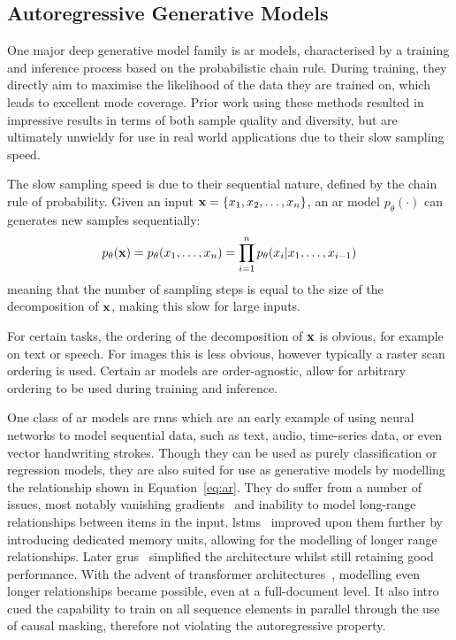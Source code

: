 \subsection{Autoregressive Generative Models}
\label{subsec:agm}
One major deep generative model family is \acrfull{ar} models, characterised by
a training and inference process based on the probabilistic chain rule. During
training, they directly aim to maximise the likelihood of the data they are
trained on, which leads to excellent mode coverage. Prior work using these
methods resulted in impressive results in terms of both sample quality and
diversity, but are ultimately unwieldy for use in real world applications due to
their slow sampling speed.

The slow sampling speed is due to their sequential nature, defined by the chain
rule of probability. Given an input $\mathbf{x} = \{ x_{1}, x_{2}, \dots,
x_{n} \}$, an \gls{ar} model $p_\theta(\cdot)$ can generates new
samples sequentially:
\begin{equation}\label{eq:ar}
    p_\theta(\mathbf{x}) = p_\theta(x_{1}, \dots, x_{n}) =
    \prod\limits^{n}_{i=1} p_\theta(x_{i} \vert x_{1}, \dots, x_{i-1})
\end{equation}
meaning that the number of sampling steps is equal to the size of the
decomposition of $\mathbf{x}$, making this slow for large inputs.

For certain tasks, the ordering of the decomposition of $\mathbf{x}$ is obvious, for
example on text or speech. For images this is less obvious, however typically a
raster scan ordering is used. Certain \gls{ar} models are order-agnostic,
allow for arbitrary ordering to be used during training and inference.

One class of \gls{ar} models are \glspl{rnn} which are an early example of using
neural networks to model sequential data, such as text, audio, time-series data,
or even vector handwriting strokes. Though they can be used as purely
classification or regression models, they are also suited for use as generative
models by modelling the relationship shown in Equation~\ref{eq:ar}. They do
suffer from a number of issues, most notably vanishing
gradients~\cite{pascanu2012rnn} and inability to model long-range relationships
between items in the input. \Glspl{lstm}~\cite{hoch1997lstm} improved upon them
further by introducing dedicated memory units, allowing for the modelling of
longer range relationships. Later \glspl{gru}~\cite{cho2014gru} simplified the
architecture whilst still retaining good performance. With the advent of
transformer architectures~\cite{vaswani2017attention}, modelling even longer
relationships became possible, even at a full-document level. It also intro cued
the capability to train on all sequence elements in parallel through the use of
causal masking, therefore not violating the autoregressive property.

